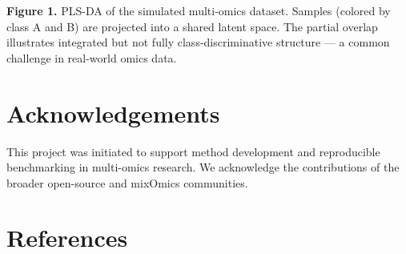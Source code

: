 \textbf{Figure 1.} PLS-DA of the simulated multi-omics dataset. Samples
(colored by class A and B) are projected into a shared latent space. The
partial overlap illustrates integrated but not fully
class-discriminative structure --- a common challenge in real-world
omics data.

\section{Acknowledgements}\label{acknowledgements}

This project was initiated to support method development and
reproducible benchmarking in multi-omics research. We acknowledge the
contributions of the broader open-source and mixOmics communities.

\section{References}\label{references}
